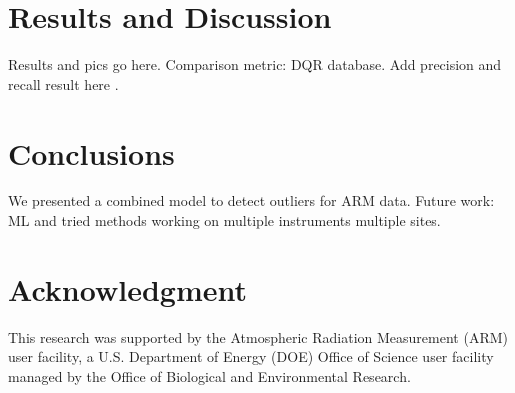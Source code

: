 \documentclass[letterpaper, 10 pt, conference]{ieeeconf}  %
\begin{document}
\section{Results and Discussion}
Results and pics go here. Comparison metric: DQR database. Add precision and 
recall result here \cite{perry1955machine}.


\section{Conclusions}
We presented a combined model to detect outliers for ARM data. Future work: 
ML and tried methods working on multiple instruments multiple sites.


\section*{Acknowledgment}
This research was supported by the Atmospheric Radiation Measurement (ARM) user 
facility, a U.S. Department of Energy (DOE) Office of Science user facility 
managed by the Office of Biological and Environmental Research.


 

\end{document}
